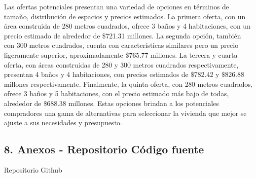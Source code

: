 \documentclass[
]{article}
\begin{document}
Las ofertas potenciales presentan una variedad de opciones en términos
de tamaño, distribución de espacios y precios estimados. La primera
oferta, con un área construida de 280 metros cuadrados, ofrece 3 baños y
4 habitaciones, con un precio estimado de alrededor de \$721.31
millones. La segunda opción, también con 300 metros cuadrados, cuenta
con características similares pero un precio ligeramente superior,
aproximadamente \$765.77 millones. La tercera y cuarta oferta, con áreas
construidas de 280 y 300 metros cuadrados respectivamente, presentan 4
baños y 4 habitaciones, con precios estimados de \$782.42 y \$826.88
millones respectivamente. Finalmente, la quinta oferta, con 280 metros
cuadrados, ofrece 3 baños y 5 habitaciones, con el precio estimado más
bajo de todas, alrededor de \$688.38 millones. Estas opciones brindan a
los potenciales compradores una gama de alternativas para seleccionar la
vivienda que mejor se ajuste a sus necesidades y presupuesto.

\subsection{8. Anexos - Repositorio Código
fuente}\label{anexos---repositorio-cuxf3digo-fuente}

Repositorio Github
\end{document}

